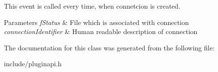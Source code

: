 \-This event is called every time, when connetcion is created. 


\begin{DoxyParams}{\-Parameters}
{\em f\-Status} & \-File which is associated with connection \\
\hline
{\em connection\-Identifier} & \-Human readable description of connection \\
\hline
\end{DoxyParams}


\-The documentation for this class was generated from the following file\-:\begin{DoxyCompactItemize}
\item 
include/pluginapi.\-h\end{DoxyCompactItemize}
